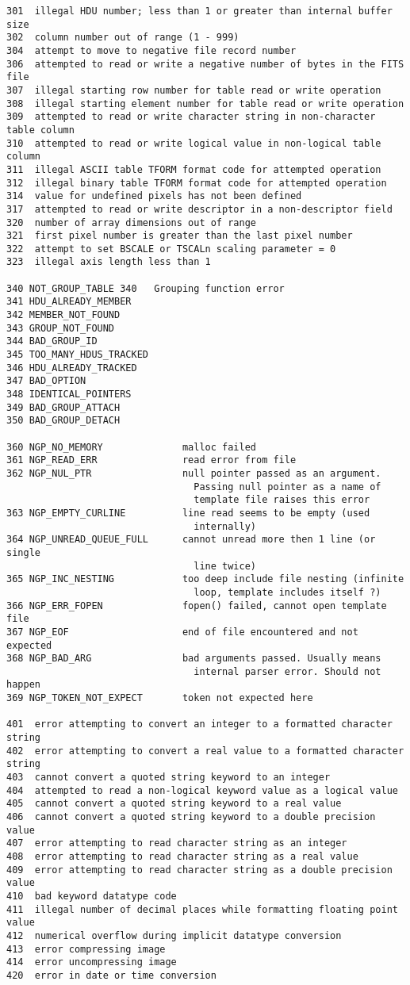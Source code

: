 \documentclass[11pt]{book}
\begin{document}
\begin{verbatim}
301  illegal HDU number; less than 1 or greater than internal buffer size
302  column number out of range (1 - 999)
304  attempt to move to negative file record number
306  attempted to read or write a negative number of bytes in the FITS file
307  illegal starting row number for table read or write operation
308  illegal starting element number for table read or write operation
309  attempted to read or write character string in non-character table column
310  attempted to read or write logical value in non-logical table column
311  illegal ASCII table TFORM format code for attempted operation
312  illegal binary table TFORM format code for attempted operation
314  value for undefined pixels has not been defined
317  attempted to read or write descriptor in a non-descriptor field
320  number of array dimensions out of range
321  first pixel number is greater than the last pixel number
322  attempt to set BSCALE or TSCALn scaling parameter = 0
323  illegal axis length less than 1

340 NOT_GROUP_TABLE 340   Grouping function error
341 HDU_ALREADY_MEMBER
342 MEMBER_NOT_FOUND
343 GROUP_NOT_FOUND
344 BAD_GROUP_ID
345 TOO_MANY_HDUS_TRACKED
346 HDU_ALREADY_TRACKED
347 BAD_OPTION
348 IDENTICAL_POINTERS
349 BAD_GROUP_ATTACH
350 BAD_GROUP_DETACH

360 NGP_NO_MEMORY              malloc failed
361 NGP_READ_ERR               read error from file
362 NGP_NUL_PTR                null pointer passed as an argument.
                                 Passing null pointer as a name of
                                 template file raises this error
363 NGP_EMPTY_CURLINE          line read seems to be empty (used
                                 internally)
364 NGP_UNREAD_QUEUE_FULL      cannot unread more then 1 line (or single
                                 line twice)
365 NGP_INC_NESTING            too deep include file nesting (infinite
                                 loop, template includes itself ?)
366 NGP_ERR_FOPEN              fopen() failed, cannot open template file
367 NGP_EOF                    end of file encountered and not expected
368 NGP_BAD_ARG                bad arguments passed. Usually means
                                 internal parser error. Should not happen
369 NGP_TOKEN_NOT_EXPECT       token not expected here

401  error attempting to convert an integer to a formatted character string
402  error attempting to convert a real value to a formatted character string
403  cannot convert a quoted string keyword to an integer
404  attempted to read a non-logical keyword value as a logical value
405  cannot convert a quoted string keyword to a real value
406  cannot convert a quoted string keyword to a double precision value
407  error attempting to read character string as an integer
408  error attempting to read character string as a real value
409  error attempting to read character string as a double precision value
410  bad keyword datatype code
411  illegal number of decimal places while formatting floating point value
412  numerical overflow during implicit datatype conversion
413  error compressing image
414  error uncompressing image
420  error in date or time conversion


\end{verbatim}
\end{document}
